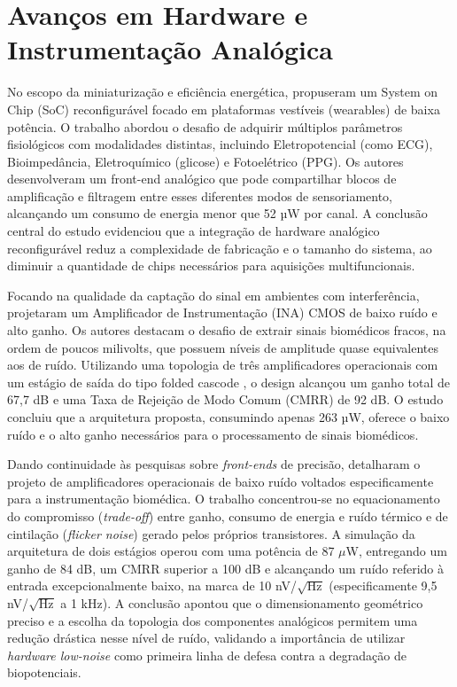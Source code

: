 \documentclass[tcc,capa]{texufpel}
\begin{document}
\section{Avanços em Hardware e Instrumentação Analógica}

No escopo da miniaturização e eficiência energética, \cite{kim2016} propuseram um System on Chip (SoC) reconfigurável focado em plataformas vestíveis (wearables) de baixa potência. O trabalho abordou o desafio de adquirir múltiplos parâmetros fisiológicos com modalidades distintas, incluindo Eletropotencial (como ECG), Bioimpedância, Eletroquímico (glicose) e Fotoelétrico (PPG). Os autores desenvolveram um front-end analógico que pode compartilhar blocos de amplificação e filtragem entre esses diferentes modos de sensoriamento, alcançando um consumo de energia menor que 52 µW por canal. A conclusão central do estudo evidenciou que a integração de hardware analógico reconfigurável reduz a complexidade de fabricação e o tamanho do sistema, ao diminuir a quantidade de chips necessários para aquisições multifuncionais.

Focando na qualidade da captação do sinal em ambientes com interferência, \cite{singh2018} projetaram um Amplificador de Instrumentação (INA) CMOS de baixo ruído e alto ganho. Os autores destacam o desafio de extrair sinais biomédicos fracos, na ordem de poucos milivolts, que possuem níveis de amplitude quase equivalentes aos de ruído. Utilizando uma topologia de três amplificadores operacionais com um estágio de saída do tipo folded cascode , o design alcançou um ganho total de 67,7 dB e uma Taxa de Rejeição de Modo Comum (CMRR) de 92 dB. O estudo concluiu que a arquitetura proposta, consumindo apenas 263 µW, oferece o baixo ruído e o alto ganho necessários para o processamento de sinais biomédicos.

Dando continuidade às pesquisas sobre \textit{front-ends} de precisão, \cite{pathak2025} detalharam o projeto de amplificadores operacionais de baixo ruído voltados especificamente para a instrumentação biomédica. O trabalho concentrou-se no equacionamento do compromisso (\textit{trade-off}) entre ganho, consumo de energia e ruído térmico e de cintilação (\textit{flicker noise}) gerado pelos próprios transistores. A simulação da arquitetura de dois estágios operou com uma potência de 87 $\mu$W, entregando um ganho de 84 dB, um CMRR superior a 100 dB e alcançando um ruído referido à entrada excepcionalmente baixo, na marca de 10 nV/$\sqrt{\text{Hz}}$ (especificamente 9,5 nV/$\sqrt{\text{Hz}}$ a 1 kHz). A conclusão apontou que o dimensionamento geométrico preciso e a escolha da topologia dos componentes analógicos permitem uma redução drástica nesse nível de ruído, validando a importância de utilizar \textit{hardware low-noise} como primeira linha de defesa contra a degradação de biopotenciais.
\end{document}
